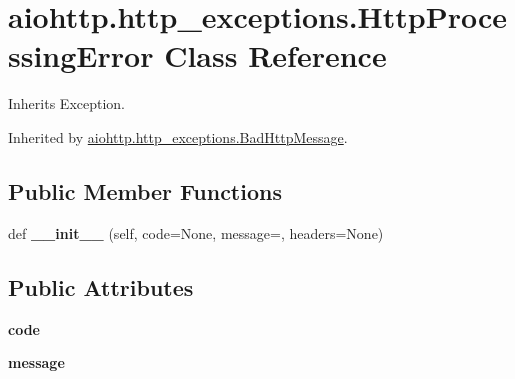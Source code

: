 \hypertarget{classaiohttp_1_1http__exceptions_1_1_http_processing_error}{}\section{aiohttp.\+http\+\_\+exceptions.\+Http\+Processing\+Error Class Reference}
\label{classaiohttp_1_1http__exceptions_1_1_http_processing_error}


Inherits Exception.



Inherited by \hyperlink{classaiohttp_1_1http__exceptions_1_1_bad_http_message}{aiohttp.\+http\+\_\+exceptions.\+Bad\+Http\+Message}.

\subsection*{Public Member Functions}
\begin{DoxyCompactItemize}
\item 
\mbox{\label{classaiohttp_1_1http__exceptions_1_1_http_processing_error_af3e7afa182071e43126bde98f476a85f}} 
def {\bfseries \+\_\+\+\_\+init\+\_\+\+\_\+} (self, code=None, message=\textquotesingle{}\textquotesingle{}, headers=None)
\end{DoxyCompactItemize}
\subsection*{Public Attributes}
\begin{DoxyCompactItemize}
\item 
\mbox{\label{classaiohttp_1_1http__exceptions_1_1_http_processing_error_a9c9e9058e8b2840af3abdb846811dd6c}} 
{\bfseries code}
\item 
\mbox{\label{classaiohttp_1_1http__exceptions_1_1_http_processing_error_a16e8784ce4bdb3919ffd7aca46ced5f6}} 
{\bfseries message}
\end{DoxyCompactItemize}
